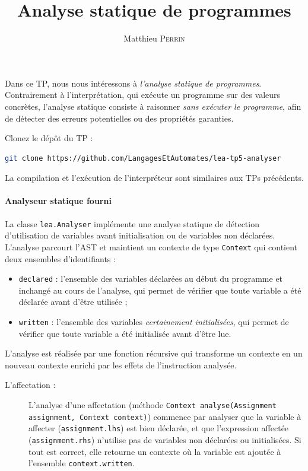 \documentclass[correction]{td}
\author{Matthieu \textsc{Perrin}}
\title{Analyse statique de programmes}
\begin{document}
\maketitle

Dans ce TP, nous nous intéressons à \emph{l'analyse statique de programmes}.
Contrairement à l'interprétation, qui exécute un programme sur des valeurs concrètes,
l'analyse statique consiste à raisonner \emph{sans exécuter le programme},
afin de détecter des erreurs potentielles ou des propriétés garanties.

\begin{exercice}

  \begin{question}
  \item Clonez le dépôt du TP :
    \begin{lstlisting}[gobble=6, language=bash]
      git clone https://github.com/LangagesEtAutomates/lea-tp5-analyser
    \end{lstlisting}

    La compilation et l'exécution de l'interpréteur sont similaires aux TPs précédents.
  \end{question}

  \paragraph{Analyseur statique fourni}
  
  La classe \lstinline{lea.Analyser} implémente une analyse statique de détection d'utilisation de variables avant initialisation ou de variables non déclarées.
  L'analyse parcourt l'AST et maintient un contexte de type \lstinline{Context} qui contient deux ensembles d'identifiants :
  \begin{itemize}
  \item \lstinline{declared} :
    l'ensemble des variables déclarées au début du programme et inchangé au cours de l'analyse,
    qui permet de vérifier que toute variable a été déclarée avant d'être utilisée ;
  \item \lstinline{written} :
    l'ensemble des variables \emph{certainement initialisées},
    qui permet de vérifier que toute variable a été initialisée avant d'être lue.
  \end{itemize}
  
  L'analyse est réalisée par une fonction récursive qui transforme un contexte en un
  nouveau contexte enrichi par les effets de l'instruction analysée. 
  \begin{description}
  \item[L'affectation :]
    L'analyse d'une affectation (méthode \lstinline{Context analyse(Assignment assignment, Context context)})
    commence par analyser que la variable à affecter (\lstinline{assignment.lhs}) est bien déclarée,
    et que l'expression affectée (\lstinline{assignment.rhs}) n'utilise pas de variables non déclarées ou initialisées.
    Si tout est correct, elle retourne un contexte où la variable est ajoutée à l'ensemble \lstinline{context.written}.
    

\end{description}
\end{exercice}
\end{document}
